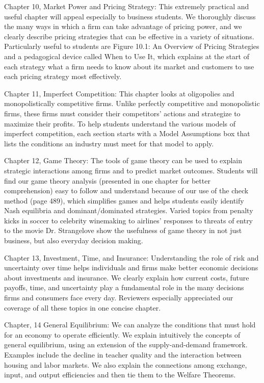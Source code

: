 Chapter 10, Market Power and Pricing Strategy: This extremely practical and useful chapter will appeal especially to business students. We thoroughly discuss the many ways in which a firm can take advantage of pricing power, and we clearly describe pricing strategies that can be effective in a variety of situations. Particularly useful to students are Figure 10.1: An Overview of Pricing Strategies and a pedagogical device called When to Use It, which explains at the start of each strategy what a firm needs to know about its market and customers to use each pricing strategy most effectively.

Chapter 11, Imperfect Competition: This chapter looks at oligopolies and monopolistically competitive firms. Unlike perfectly competitive and monopolistic firms, these firms must consider their competitors' actions and strategize to maximize their profits. To help students understand the various models of imperfect competition, each section starts with a Model Assumptions box that lists the conditions an industry must meet for that model to apply.

Chapter 12, Game Theory: The tools of game theory can be used to explain strategic interactions among firms and to predict market outcomes. Students will find our game theory analysis (presented in one chapter for better comprehension) easy to follow and understand because of our use of the check method (page 489), which simplifies games and helps students easily identify Nash equilibria and dominant/dominated strategies. Varied topics from penalty kicks in soccer to celebrity winemaking to airlines' responses to threats of entry to the movie Dr. Strangelove show the usefulness of game theory in not just business, but also everyday decision making.

Chapter 13, Investment, Time, and Insurance: Understanding the role of risk and uncertainty over time helps individuals and firms make better economic decisions about investments and insurance. We clearly explain how current costs, future payoffs, time, and uncertainty play a fundamental role in the many decisions firms and consumers face every day. Reviewers especially appreciated our coverage of all these topics in one concise chapter.

Chapter, 14 General Equilibrium: We can analyze the conditions that must hold for an economy to operate efficiently. We explain intuitively the concepts of general equilibrium, using an extension of the supply-and-demand framework. Examples include the decline in teacher quality and the interaction between housing and labor markets. We also explain the connections among exchange, input, and output efficiencies and then tie them to the Welfare Theorems.

